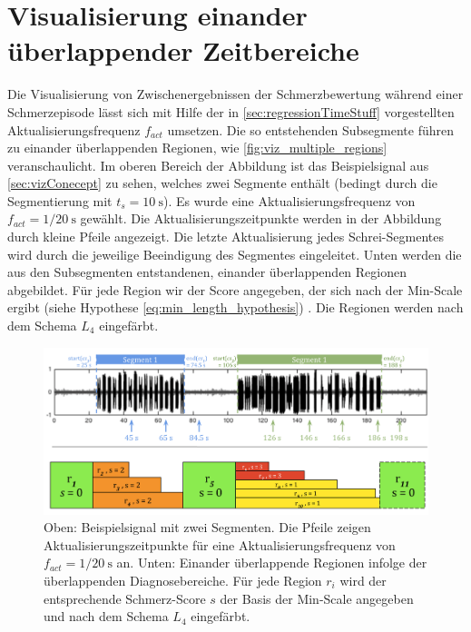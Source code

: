  
\section{Visualisierung einander überlappender Zeitbereiche}
\label{sec:vizWithOverlap}
 
Die Visualisierung von \glqq Zwischenergebnissen\grqq{} der Schmerzbewertung während einer Schmerzepisode lässt sich mit Hilfe der in \autoref{sec:regressionTimeStuff} vorgestellten Aktualisierungsfrequenz $f_{act}$ umsetzen. Die so entstehenden Subsegmente führen zu einander überlappenden Regionen, wie \autoref{fig:viz_multiple_regions} veranschaulicht. Im oberen Bereich der Abbildung ist das Beispielsignal aus \autoref{sec:vizConecept} zu sehen, welches zwei Segmente enthält (bedingt durch die Segmentierung mit $t_s = \SI{10}{\second}$). Es wurde eine Aktualisierungsfrequenz von  $f_{act} = 1/ \SI{20}{\second}$ gewählt. Die Aktualisierungszeitpunkte werden in der Abbildung durch kleine Pfeile angezeigt. Die letzte Aktualisierung jedes Schrei-Segmentes wird durch die jeweilige Beeindigung des Segmentes eingeleitet. Unten werden die aus den Subsegmenten entstandenen, einander überlappenden Regionen abgebildet. Für jede Region wir der Score angegeben, der sich nach der Min-Scale ergibt (siehe Hypothese \autoref{eq:min_length_hypothesis}) . Die Regionen werden nach dem Schema $L_4$ eingefärbt.

\begin{figure}[h]
	\centering
	\includegraphics[width=1\textwidth]{bilder/viz-multiple-regions.png}
	\caption[Ein Beispielsignal mit zeitlich einander überlappenden Diagnosebereichen]{Oben: Beispielsignal mit zwei Segmenten. Die Pfeile zeigen Aktualisierungszeitpunkte für eine Aktualisierungsfrequenz von $f_{act} = 1/ \SI{20}{\second}$ an. Unten: Einander überlappende Regionen infolge der überlappenden Diagnosebereiche. Für jede Region $r_i$ wird der entsprechende Schmerz-Score $s$ der Basis der Min-Scale angegeben und nach dem Schema $L_4$ eingefärbt.}
	\label{fig:viz_multiple_regions}
\end{figure}

